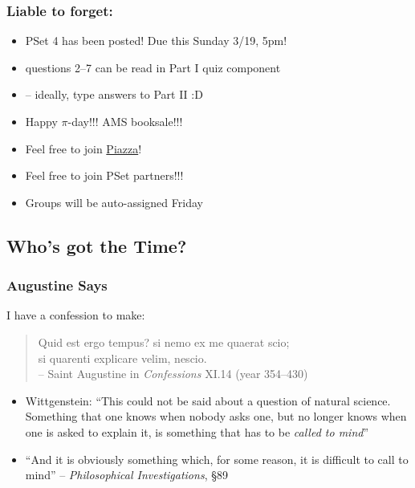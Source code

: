 \begin{frame}

\scriptsize{\tableofcontents}

\end{frame}


\begin{frame}
\frametitle{Liable to forget:}

\begin{itemize}[<+->]

\item PSet 4 has been posted! Due this Sunday 3/19, 5pm!

\item[] questions 2--7 can be read in Part I quiz component

\item[] -- ideally, type answers to Part II :D 

\item Happy $\pi$-day!!! AMS booksale!!! 

\item Feel free to join \href{https://piazza.com/mit/spring2023/24118}{Piazza}! 

\item Feel free to join PSet partners!!! 
\item[] Groups will be auto-assigned Friday


\end{itemize}
\end{frame}

\subsection{Who's got the Time?}

\begin{frame}
\frametitle{Augustine Says}

I have a confession to make:

\pause 
\begin{quote}
Quid est ergo tempus? si nemo ex me quaerat scio; \\ si quarenti explicare velim, nescio. \\
\pause -- Saint Augustine in \textit{Confessions} XI.14 (year 354--430)
\end{quote}

\begin{itemize}[<+->]

\item Wittgenstein: ``This could not be said about a question of natural science. Something that one knows when nobody asks one, but no longer knows when one is asked to explain it, is something that has to be \textit{called to mind}''
\item[] ``And it is obviously something which, for some reason, it is difficult to call to mind''  -- \textit{Philosophical Investigations}, \S 89 


\end{itemize}

\end{frame}


